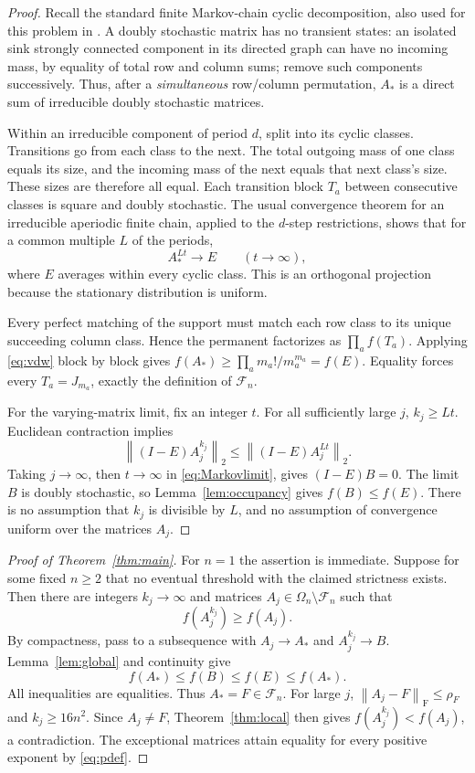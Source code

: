 \documentclass[11pt]{article}
\theoremstyle{remark}\newtheorem{remark}[theorem]{Remark}
\newcommand{\Om}{\Omega_n}
\newcommand{\Fset}{\mathcal F_n}
\newcommand{\fn}[1]{\left\|#1\right\|_{\mathrm F}}
\newcommand{\op}[1]{\left\|#1\right\|_{2}}
\begin{document}
\begin{proof}
Recall the standard finite Markov-chain cyclic decomposition, also used
for this problem in \cite{Mel}. A doubly stochastic matrix has no
transient states: an isolated sink strongly connected component in its
directed graph can have no incoming mass, by equality of total row and
column sums; remove such components successively. Thus, after a
\emph{simultaneous} row/column permutation, $A_*$ is a direct sum of
irreducible doubly stochastic matrices.

Within an irreducible component of period $d$, split into its cyclic
classes. Transitions go from each class to the next. The total outgoing
mass of one class equals its size, and the incoming mass of the next
equals that next class's size. These sizes are therefore all equal.
Each transition block $T_a$ between consecutive classes is square and
doubly stochastic. The usual convergence theorem for an irreducible
aperiodic finite chain, applied to the $d$-step restrictions, shows that
for a common multiple $L$ of the periods,
\begin{equation}\label{eq:Markovlimit}
 A_*^{Lt}\longrightarrow E\qquad(t\to\infty),
\end{equation}
where $E$ averages within every cyclic class. This is an orthogonal
projection because the stationary distribution is uniform.

Every perfect matching of the support must match each row class to
its unique succeeding column class. Hence the permanent factorizes as
$\prod_a f(T_a)$. Applying \eqref{eq:vdw} block by block gives
$f(A_*)\ge\prod_a m_a!/m_a^{m_a}=f(E)$. Equality forces every
$T_a=J_{m_a}$, exactly the definition of $\Fset$.

For the varying-matrix limit, fix an integer $t$. For all sufficiently
large $j$, $k_j\ge Lt$. Euclidean contraction implies
\[
 \op{(I-E)A_j^{k_j}}
 \le\op{(I-E)A_j^{Lt}}.
\]
Taking $j\to\infty$, then $t\to\infty$ in
\eqref{eq:Markovlimit}, gives $(I-E)B=0$. The limit $B$ is doubly
stochastic, so Lemma~\ref{lem:occupancy} gives $f(B)\le f(E)$.
There is no assumption that $k_j$ is divisible by $L$, and no assumption
of convergence uniform over the matrices $A_j$.
\end{proof}

\begin{proof}[Proof of Theorem~\ref{thm:main}]
For $n=1$ the assertion is immediate. Suppose for some fixed $n\ge2$
that no eventual threshold with the claimed strictness exists.
Then there are integers $k_j\to\infty$ and matrices
$A_j\in\Om\setminus\Fset$ such that
\[
 f(A_j^{k_j})\ge f(A_j).
\]
By compactness, pass to a subsequence with $A_j\to A_*$ and
$A_j^{k_j}\to B$. Lemma~\ref{lem:global} and continuity give
\[
 f(A_*)\le f(B)\le f(E)\le f(A_*).
\]
All inequalities are equalities. Thus $A_*=F\in\Fset$.
For large $j$, $\fn{A_j-F}\le\rho_F$ and $k_j\ge16n^2$.
Since $A_j\ne F$, Theorem~\ref{thm:local} then gives
$f(A_j^{k_j})<f(A_j)$, a contradiction. The exceptional matrices attain
equality for every positive exponent by \eqref{eq:pdef}.
\end{proof}
\end{document}
